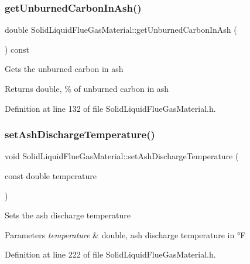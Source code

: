 \subsubsection{\texorpdfstring{get\+Unburned\+Carbon\+In\+Ash()}{getUnburnedCarbonInAsh()}}
{\footnotesize\ttfamily double Solid\+Liquid\+Flue\+Gas\+Material\+::get\+Unburned\+Carbon\+In\+Ash (\begin{DoxyParamCaption}{ }\end{DoxyParamCaption}) const\hspace{0.3cm}{\ttfamily [inline]}}

Gets the unburned carbon in ash \begin{DoxyReturn}{Returns}
double, \% of unburned carbon in ash 
\end{DoxyReturn}


Definition at line 132 of file Solid\+Liquid\+Flue\+Gas\+Material.\+h.

\mbox{\label{class_solid_liquid_flue_gas_material_ad29543a88737c3d051c7d824287bc791}} 
\subsubsection{\texorpdfstring{set\+Ash\+Discharge\+Temperature()}{setAshDischargeTemperature()}}
{\footnotesize\ttfamily void Solid\+Liquid\+Flue\+Gas\+Material\+::set\+Ash\+Discharge\+Temperature (\begin{DoxyParamCaption}\item[{const double}]{temperature }\end{DoxyParamCaption})\hspace{0.3cm}{\ttfamily [inline]}}

Sets the ash discharge temperature 
\begin{DoxyParams}{Parameters}
{\em temperature} & double, ash discharge temperature in °F \\
\hline
\end{DoxyParams}


Definition at line 222 of file Solid\+Liquid\+Flue\+Gas\+Material.\+h.

\mbox{\label{class_solid_liquid_flue_gas_material_a626dfbc9ba87abff99e5c5a8204d69c6}} 
